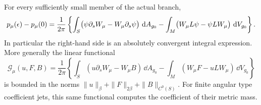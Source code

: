 \begin{lemma}
\label{ads:lem:green}
For every sufficiently small member of the actual branch,
\begin{equation}
 p_\mu(\epsilon)-p_\mu(0)
 =\frac1{2\pi}\left\{
   \int_S\bigl(\psi\partial_sW_\mu-W_\mu\partial_s\psi\bigr)\,\,\mathrm d A_{g_0}
   -\int_M\bigl(W_\mu L\psi-\psi LW_\mu\bigr)\,\,\mathrm d V_{g_0}
                 \right\}.
 \label{ads:ana:green}
\end{equation}
In particular the right-hand side is an absolutely convergent integral
expression.  More generally the linear functional
\begin{equation}
 \mathcal G_\mu(u,F,B)
 =\frac1{2\pi}\left\{
 \int_S(u\partial_sW_\mu-W_\mu B)\,\dd A_{g_0}
 -\int_M(W_\mu F-uLW_\mu)\,\dd V_{g_0}\right\}
 \label{ads:ana:green-functional}
\end{equation}
is bounded in the norms
$\|u\|_\beta+\|F\|_{2\beta}+\|B\|_{C^0(S)}$.
For finite angular type coefficient jets, this same functional computes
the coefficient of their metric mass.
\end{lemma}

